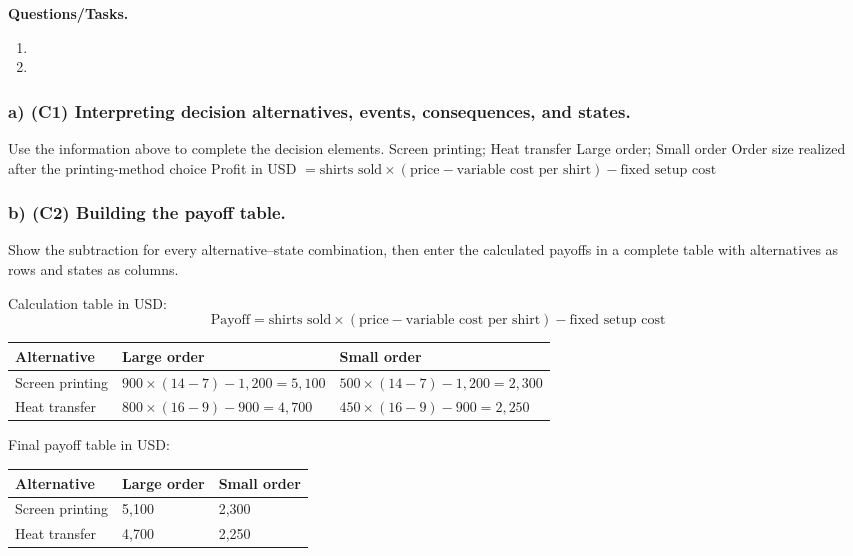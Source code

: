 \textbf{Questions/Tasks.}
\begin{enumerate}[label=\textbf{\alph*)}]
 \item {}
 \item {}
\end{enumerate}
\subsubsection*{a) \textbf{(C1)} Interpreting decision alternatives, events, consequences, and states.}
\label{subsec:problem13-custom-t-shirt-order-c1}
Use the information above to complete the decision elements.
\DecisionElementsTable
{Screen printing; Heat transfer}
{Large order; Small order}
{Order size realized after the printing-method choice}
{Profit in USD $= \text{shirts sold} \times (\text{price} - \text{variable cost per shirt}) - \text{fixed setup cost}$}
\subsubsection*{b) \textbf{(C2)} Building the payoff table.}
\label{subsec:problem13-custom-t-shirt-order-c2}
Show the subtraction for every alternative--state combination, then enter the calculated payoffs in a complete table with alternatives as rows and states as columns.

Calculation table in USD:
\[
\text{Payoff}=\text{shirts sold}\times(\text{price}-\text{variable cost per shirt})-\text{fixed setup cost}
\]
\begin{center}
\small
\begin{tabular}{lll}
\toprule
Alternative & Large order & Small order \\
\midrule
Screen printing & $900 \times (14 - 7) - 1{,}200 = 5{,}100$ & $500 \times (14 - 7) - 1{,}200 = 2{,}300$ \\
Heat transfer & $800 \times (16 - 9) - 900 = 4{,}700$ & $450 \times (16 - 9) - 900 = 2{,}250$ \\
\bottomrule
\end{tabular}
\end{center}

Final payoff table in USD:
\begin{center}
\begin{tabular}{lll}
\toprule
Alternative & Large order & Small order \\
\midrule
Screen printing & 5{,}100 & 2{,}300 \\
Heat transfer & 4{,}700 & 2{,}250 \\
\bottomrule
\end{tabular}
\end{center}
